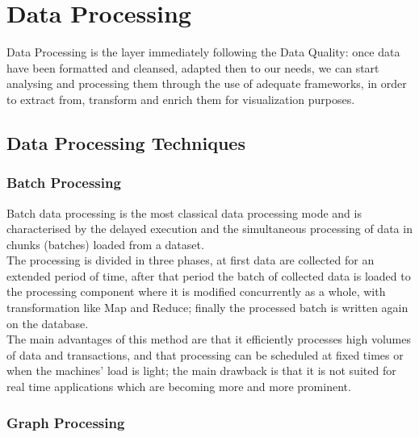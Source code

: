 \chapter{Data Processing}

Data Processing is the layer immediately following the Data Quality: once data have been formatted and cleansed, adapted then to our needs, we can start analysing and processing them through the use of adequate frameworks, in order to extract from, transform and enrich them for visualization purposes.\\

\section{Data Processing Techniques}

\subsection{Batch Processing} \label{BatchProc}

Batch data processing is the most classical data processing mode and is characterised by the delayed execution and the simultaneous processing of data in chunks (batches) loaded from a dataset.
\\
\newline
The processing is divided in three phases, at first data are collected for an extended period of time, after that period the batch of collected data is loaded to the processing component where it is modified concurrently as a whole, with transformation like Map and Reduce; finally the processed batch is written again on the database.
\newline
\\
The main advantages of this method are that it efficiently processes high volumes of data and transactions, and that processing can be scheduled at fixed times or when the machines' load is light; the main drawback is that it is not suited for real time applications which are becoming more and more prominent.

\subsection{Graph Processing} \label{GraphProc}

